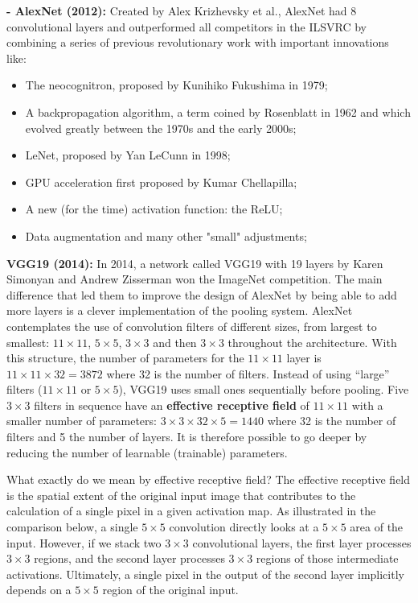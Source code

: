 \textbf{- AlexNet (2012):} Created by Alex Krizhevsky et al., AlexNet had 8 convolutional layers and outperformed all competitors in the ILSVRC by combining a series of previous revolutionary work with important innovations like:
\begin{itemize}
    \item[-] The neocognitron, proposed by Kunihiko Fukushima in 1979;
    \item[-] A backpropagation algorithm, a term coined by Rosenblatt in 1962 and which evolved greatly between the 1970s and the early 2000s;
    \item[-] LeNet, proposed by Yan LeCunn in 1998;
    \item[-] GPU acceleration first proposed by Kumar Chellapilla;
    \item[-] A new (for the time) activation function: the ReLU;
    \item[-] Data augmentation and many other "small" adjustments;
\end{itemize}

\textbf{VGG19 (2014):} In 2014, a network called VGG19 with 19 layers by Karen Simonyan and Andrew Zisserman won the ImageNet competition. The main difference that led them to improve the design of AlexNet by being able to add more layers is a clever implementation of the pooling system. AlexNet contemplates the use of convolution filters of different sizes, from largest to smallest: $11 \times 11$, $5 \times 5$, $3 \times 3$ and then $3 \times 3$ throughout the architecture. With this structure, the number of parameters for the $11 \times 11$ layer is $11 \times 11 \times 32 = 3872$ where 32 is the number of filters. Instead of using “large” filters ($11 \times 11$ or $5 \times 5$), VGG19 uses small ones sequentially before pooling. Five $3 \times 3$ filters in sequence have an \textbf{effective receptive field} of $11 \times 11$ with a smaller number of parameters: $3 \times 3 \times 32 \times 5 = 1440$ where 32 is the number of filters and 5 the number of layers. It is therefore possible to go deeper by reducing the number of learnable (trainable) parameters. 

What exactly do we mean by effective receptive field? The effective receptive field is the spatial extent of the original input image that contributes to the calculation of a single pixel in a given activation map. As illustrated in the comparison below, a single $5 \times 5$ convolution directly looks at a $5 \times 5$ area of the input. However, if we stack two $3 \times 3$ convolutional layers, the first layer processes $3 \times 3$ regions, and the second layer processes $3 \times 3$ regions of those intermediate activations. Ultimately, a single pixel in the output of the second layer implicitly depends on a $5 \times 5$ region of the original input. 


